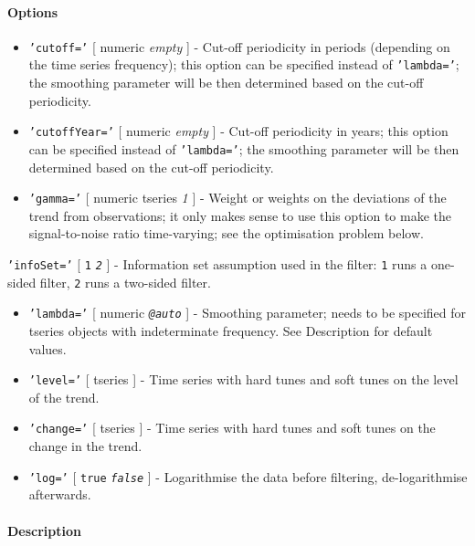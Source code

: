  \paragraph{Options}
 
 \begin{itemize}
 \item
   \texttt{'cutoff='} {[} numeric \textbar{} \emph{empty} {]} - Cut-off
   periodicity in periods (depending on the time series frequency); this
   option can be specified instead of \texttt{'lambda='}; the smoothing
   parameter will be then determined based on the cut-off periodicity.
 \item
   \texttt{'cutoffYear='} {[} numeric \textbar{} \emph{empty} {]} -
   Cut-off periodicity in years; this option can be specified instead of
   \texttt{'lambda='}; the smoothing parameter will be then determined
   based on the cut-off periodicity.
 \item
   \texttt{'gamma='} {[} numeric \textbar{} tseries \textbar{} \emph{1}
   {]} - Weight or weights on the deviations of the trend from
   observations; it only makes sense to use this option to make the
   signal-to-noise ratio time-varying; see the optimisation problem
   below.
 \end{itemize}
 
 \texttt{'infoSet='} {[} \texttt{1} \textbar{} \emph{\texttt{2}} {]} -
 Information set assumption used in the filter: \texttt{1} runs a
 one-sided filter, \texttt{2} runs a two-sided filter.
 
 \begin{itemize}
 \item
   \texttt{'lambda='} {[} numeric \textbar{} \emph{\texttt{@auto}} {]} -
   Smoothing parameter; needs to be specified for tseries objects with
   indeterminate frequency. See Description for default values.
 \item
   \texttt{'level='} {[} tseries {]} - Time series with hard tunes and
   soft tunes on the level of the trend.
 \item
   \texttt{'change='} {[} tseries {]} - Time series with hard tunes and
   soft tunes on the change in the trend.
 \item
   \texttt{'log='} {[} \texttt{true} \textbar{} \emph{\texttt{false}} {]}
   - Logarithmise the data before filtering, de-logarithmise afterwards.
 \end{itemize}
 
 \paragraph{Description}
 

